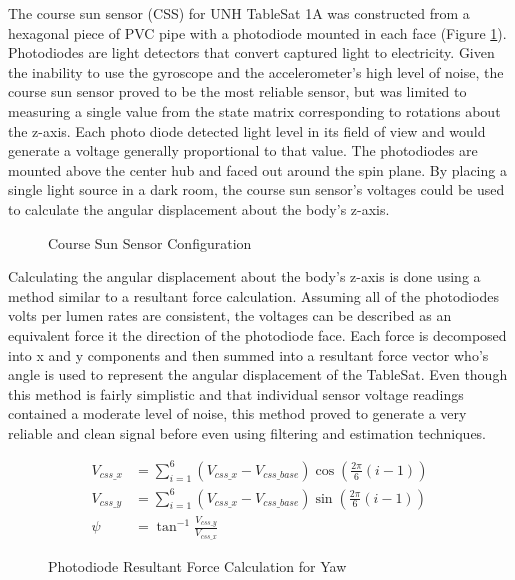 The course sun sensor (CSS) for UNH TableSat 1A was constructed from a hexagonal piece of PVC pipe with a photodiode mounted in each face (Figure \ref{fig:CSS}).  Photodiodes are light detectors that convert captured light to electricity.  Given the inability to use the gyroscope and the accelerometer's high level of noise, the course sun sensor proved to be the most reliable sensor, but was limited to measuring a single value from the state matrix corresponding to rotations about the z-axis.  Each photo diode detected light level in its field of view and would generate a voltage generally proportional to that value.  The photodiodes are mounted above the center hub and faced out around the spin plane.  By placing a single light source in a dark room, the course sun sensor's voltages could be used to calculate the angular displacement about the body's z-axis.


\begin{figure}[H]
\centerline{}
\caption{Course Sun Sensor Configuration}
\label{fig:CSS}
\end{figure}

Calculating the angular displacement about the body's z-axis is done using a method similar to a resultant force calculation.  Assuming all of the photodiodes volts per lumen rates are consistent, the voltages can be described as an equivalent force it the direction of the photodiode face.  Each force is decomposed into x and y components and then summed into a resultant force vector who's angle is used to represent the angular displacement of the TableSat.  Even though this method is fairly simplistic and that individual sensor voltage readings contained a moderate level of noise, this method proved to generate a very reliable and clean signal before even using filtering and estimation techniques.

\begin{subequations}
  \begin{align}
    V_{css\_x} & = \sum\limits_{i=1}^6 (V_{css\_x} - V_{css\_base}) \cos \left( \frac{2\pi}{6} (i-1)\right) \\
    V_{css\_y} & = \sum\limits_{i=1}^6 (V_{css\_x} - V_{css\_base}) \sin \left( \frac{2\pi}{6} (i-1)\right) \\
    \psi & = \tan^{-1} \frac{V_{css\_y}}{V_{css\_x}}
  \end{align}
  \label{eqn:CSSResultantForce}
\end{subequations}

\begin{figure}[H]
\centerline{}
\caption{Photodiode Resultant Force Calculation for Yaw}
\label{fig:CSSVectors}
\end{figure}


